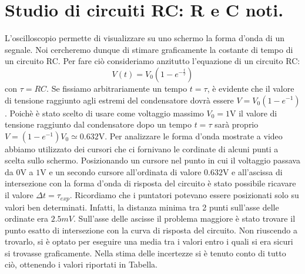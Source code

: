 \section{Studio di circuiti RC: R e C noti.}
L'oscilloscopio permette di visualizzare su uno schermo la forma d'onda di un segnale. Noi cercheremo dunque di stimare graficamente la costante di tempo di un circuito RC. Per fare ciò consideriamo anzitutto l'equazione di un circuito RC:
\begin{equation}
V(t)=V_0(1-e^{-\frac{t}{\tau}})
\label{RC}
\end{equation}
con $\tau=RC$. Se fissiamo arbitrariamente un tempo $t=\tau$, è evidente che il valore di tensione raggiunto agli estremi del condensatore dovrà essere $V=V_0(1-e^{-1})$. Poichè è stato scelto di usare come voltaggio massimo $V_0 = 1\si{\volt}$ il valore di tensione raggiunto dal condensatore dopo un tempo $t=\tau$ sarà proprio $V=(1-e^{-1})V_0 \simeq 0.632\si{\volt}$. 
Per analizzare le forma d'onda mostrate a video abbiamo utilizzato dei cursori che ci fornivano le cordinate di alcuni punti a scelta sullo schermo. Posizionando un cursore nel punto in cui il voltaggio passava da $0\si{\volt}$ a $1\si{\volt}$ e un secondo cursore all'ordinata di valore $0.632\si{\volt}$ e all'ascissa di intersezione con la forma d'onda di risposta del circuito è stato possibile ricavare il valore $\Delta t = \tau_{exp}$.
Ricordiamo che i puntatori potevano essere posizionati solo su valori ben determinati. Infatti, la distanza minima tra 2 punti sull'asse delle ordinate era $2.5mV$. Sull'asse delle ascisse il problema maggiore è stato trovare il punto esatto di intersezione con la curva di risposta del circuito. Non riuscendo a trovarlo, si è optato per eseguire una media tra i valori entro i quali si era sicuri si trovasse graficamente. Nella stima delle incertezze si è tenuto conto di tutto ciò, ottenendo i valori riportati in Tabella.

